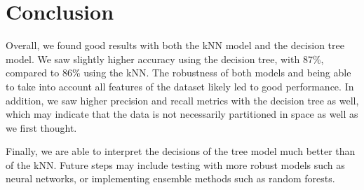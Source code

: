 \documentclass{article}
\begin{document}
\section*{Conclusion}

Overall, we found good results with both the kNN model and the decision tree model. We saw slightly higher accuracy using the decision tree, with 87\%, compared to 86\% using the kNN. The robustness of both models and being able to take into account all features of the dataset likely led to good performance. In addition, we saw higher precision and recall metrics with the decision tree as well, which may indicate that the data is not necessarily partitioned in space as well as we first thought.

Finally, we are able to interpret the decisions of the tree model much better than of the kNN. Future steps may include testing with more robust models such as neural networks, or implementing ensemble methods such as random forests.
\end{document}
